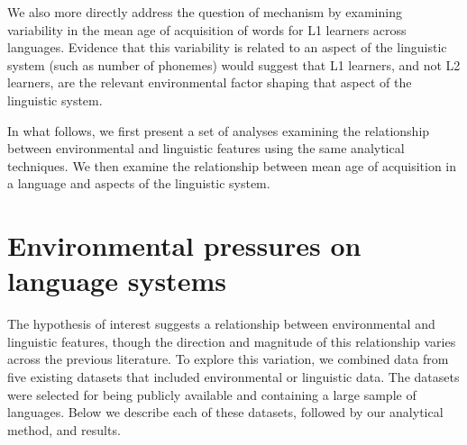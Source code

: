 \documentclass[10pt,letterpaper]{article}
\begin{document}
We also more directly address the question of mechanism by examining variability in the mean age of acquisition of words for L1 learners across languages. Evidence that this variability is related to an aspect of the linguistic system (such as number of phonemes) would suggest that L1 learners, and not L2 learners, are the relevant environmental factor shaping that aspect of the linguistic system. 

In what follows, we first present a set of analyses examining the relationship between environmental and linguistic features using the same analytical techniques.  We then examine the relationship between mean age of acquisition in a language and aspects of the linguistic system.

\section{Environmental pressures on language systems}
The hypothesis of interest suggests a relationship between environmental and linguistic features, though the direction  and magnitude of this relationship varies across the previous literature. To explore this variation, we combined data from five existing datasets that included environmental or linguistic data. The datasets were selected for being publicly available and containing a large sample of languages. Below we describe each of these datasets, followed by our analytical method, and results.
\end{document}
